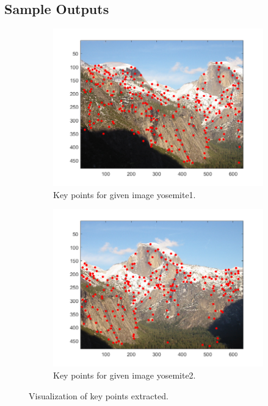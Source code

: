 \documentclass{article}
\begin{document}
\subsection{Sample Outputs}
\begin{figure}[!htb]
\begin{subfigure}{.5\textwidth}
  \centering
  \includegraphics[width=.99\textwidth]{yosemite1_keypoints.png}
  \caption{Key points for given image yosemite1.}
\end{subfigure}%
\begin{subfigure}{.5\textwidth}
  \centering
  \includegraphics[width=.99\textwidth]{yosemite2_keypoints.png}
  \caption{Key points for given image yosemite2.}
\end{subfigure}
\caption{Visualization of key points extracted.}
\end{figure}
\end{document}
